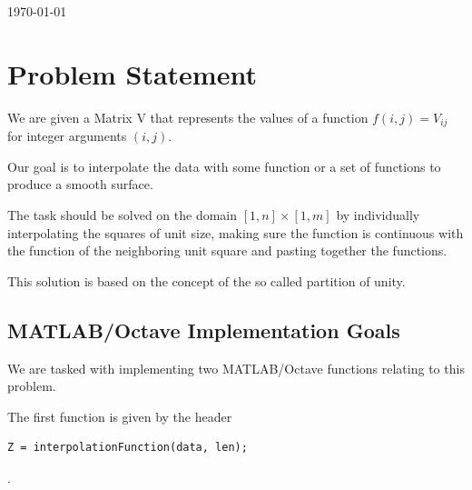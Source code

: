 \documentclass[fleqn]{article}
\begin{document}
\begin{titlepage}
	
	\vfill\vfill\vfill %
	
	{\large\today} %
	
	
	 
	
	\vfill %
	
\end{titlepage}
\tableofcontents
\newpage


\section{Problem Statement}

We are given a Matrix V that represents the values of a function $f(i, j) = V_{ij}$ for integer arguments $(i, j)$.

Our goal is to interpolate the data with some function or a set of functions to produce a smooth surface.

The task should be solved on the domain $[1, n] \times [1, m]$ by individually interpolating the squares of unit size, making sure the function is continuous with the function of the neighboring unit square and pasting together the functions.

This solution is based on the concept of the so called partition of unity.

\subsection{MATLAB/Octave Implementation Goals}

We are tasked with implementing two MATLAB/Octave functions relating to this problem.

The first function is given by the header

\begin{tcolorbox}
\begin{verbatim}
Z = interpolationFunction(data, len);
\end{verbatim}.
\end{tcolorbox}
\end{document}
